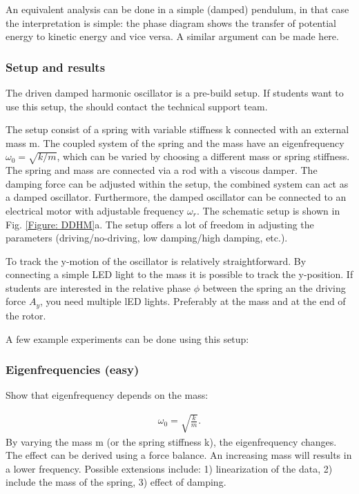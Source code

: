\documentclass{article}
\begin{document}
An equivalent analysis can be done in a simple (damped) pendulum, in that case the interpretation is simple: the phase diagram shows the transfer of potential energy to kinetic energy and vice versa. A similar argument can be made here. 

\subsubsection{Setup and results}
The driven damped harmonic oscillator is a pre-build setup. If students want to use this setup, the should contact the technical support team.

The setup consist of a spring with variable stiffness k connected with an external mass m. The coupled system of the spring and the mass have an eigenfrequency $\omega_0 = \sqrt{k/m}$, which can be varied by choosing a different mass or spring stiffness. The spring and mass are connected via a rod with a viscous damper. The damping force can be adjusted within the setup, the combined system can act as a damped oscillator. Furthermore, the damped oscillator can be connected to an electrical motor with adjustable frequency $\omega_r$. The schematic setup is shown in Fig. \ref{Figure: DDHM}a. The setup offers a lot of freedom in adjusting the parameters (driving/no-driving, low damping/high damping, etc.).

To track the y-motion of the oscillator is relatively straightforward. By connecting a simple LED light to the mass it is possible to track the y-position. If students are interested in the relative phase $\phi$ between the spring an the driving force $A_y$, you need multiple lED lights. Preferably at the mass and at the end of the rotor.

A few example experiments can be done using this setup:

\subsubsection{Eigenfrequencies (easy)}    
Show that eigenfrequency depends on the mass:

\begin{align}
    \omega_0 = \sqrt{\frac{k}{m}}.
\end{align}
By varying the mass m (or the spring stiffness k), the eigenfrequency changes. The effect can be derived using a force balance. An increasing mass will results in a lower frequency. Possible extensions include: 1) linearization of the data, 2) include the mass of the spring, 3) effect of damping.
\end{document}
